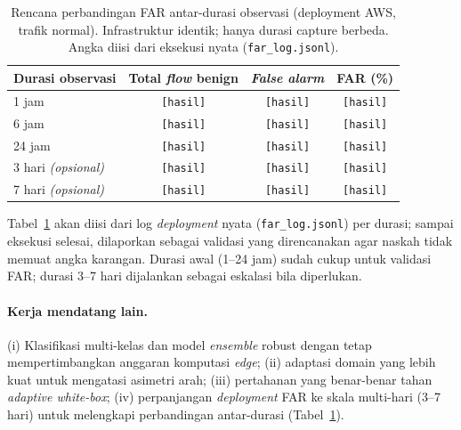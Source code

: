\documentclass[11pt,a4paper]{article}
\begin{document}
\begin{table}[h]
\centering
\caption{Rencana perbandingan FAR antar-durasi observasi (deployment AWS, trafik
normal). Infrastruktur identik; hanya durasi capture berbeda. Angka diisi dari
eksekusi nyata (\texttt{far\_log.jsonl}).}
\label{tab:far}
\begin{tabular}{lccc}
\toprule
Durasi observasi & Total \emph{flow} benign & \emph{False alarm} & FAR (\%) \\
\midrule
1 jam            & \texttt{[hasil]} & \texttt{[hasil]} & \texttt{[hasil]} \\
6 jam            & \texttt{[hasil]} & \texttt{[hasil]} & \texttt{[hasil]} \\
24 jam           & \texttt{[hasil]} & \texttt{[hasil]} & \texttt{[hasil]} \\
3 hari \emph{(opsional)} & \texttt{[hasil]} & \texttt{[hasil]} & \texttt{[hasil]} \\
7 hari \emph{(opsional)} & \texttt{[hasil]} & \texttt{[hasil]} & \texttt{[hasil]} \\
\bottomrule
\end{tabular}
\end{table}

\noindent Tabel~\ref{tab:far} akan diisi dari log \emph{deployment} nyata
(\texttt{far\_log.jsonl}) per durasi; sampai eksekusi selesai, dilaporkan sebagai
validasi yang direncanakan agar naskah tidak memuat angka karangan. Durasi awal
(1--24 jam) sudah cukup untuk validasi FAR; durasi 3--7 hari dijalankan sebagai
eskalasi bila diperlukan.

\ifadversarial
\paragraph{Kerja mendatang lain.} (i) Klasifikasi multi-kelas dan model
\emph{ensemble} robust dengan tetap mempertimbangkan anggaran komputasi
\emph{edge}; (ii) adaptasi domain yang lebih kuat untuk mengatasi asimetri arah;
(iii) pertahanan yang benar-benar tahan \emph{adaptive white-box};
(iv) perpanjangan \emph{deployment} FAR ke skala multi-hari (3--7 hari) untuk
melengkapi perbandingan antar-durasi (Tabel~\ref{tab:far}).
\else
\end{document}
